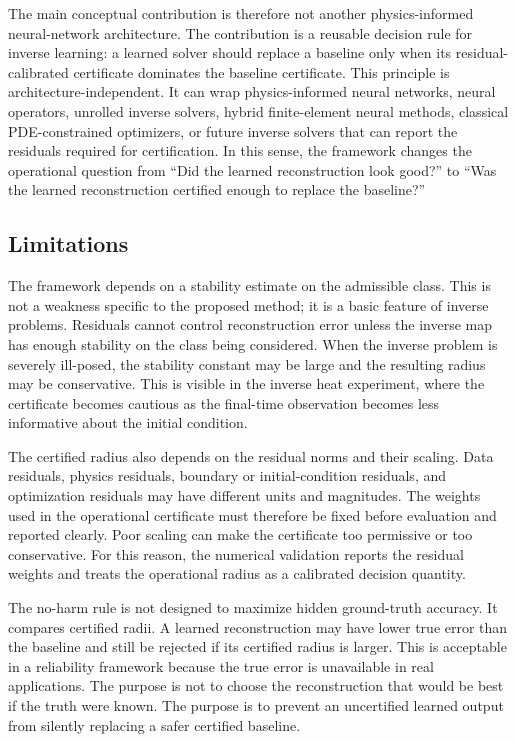 \documentclass{article}
\numberwithin{equation}{section}
\theoremstyle{definition}
\begin{document}
The main conceptual contribution is therefore not another physics-informed neural-network architecture. The contribution is a reusable decision rule for inverse learning: a learned solver should replace a baseline only when its residual-calibrated certificate dominates the baseline certificate. This principle is architecture-independent. It can wrap physics-informed neural networks, neural operators, unrolled inverse solvers, hybrid finite-element neural methods, classical PDE-constrained optimizers, or future inverse solvers that can report the residuals required for certification. In this sense, the framework changes the operational question from ``Did the learned reconstruction look good?'' to ``Was the learned reconstruction certified enough to replace the baseline?''

\subsection{Limitations}
\label{sec:limitations}

The framework depends on a stability estimate on the admissible class. This is not a weakness specific to the proposed method; it is a basic feature of inverse problems. Residuals cannot control reconstruction error unless the inverse map has enough stability on the class being considered. When the inverse problem is severely ill-posed, the stability constant may be large and the resulting radius may be conservative. This is visible in the inverse heat experiment, where the certificate becomes cautious as the final-time observation becomes less informative about the initial condition.

The certified radius also depends on the residual norms and their scaling. Data residuals, physics residuals, boundary or initial-condition residuals, and optimization residuals may have different units and magnitudes. The weights used in the operational certificate must therefore be fixed before evaluation and reported clearly. Poor scaling can make the certificate too permissive or too conservative. For this reason, the numerical validation reports the residual weights and treats the operational radius as a calibrated decision quantity.

The no-harm rule is not designed to maximize hidden ground-truth accuracy. It compares certified radii. A learned reconstruction may have lower true error than the baseline and still be rejected if its certified radius is larger. This is acceptable in a reliability framework because the true error is unavailable in real applications. The purpose is not to choose the reconstruction that would be best if the truth were known. The purpose is to prevent an uncertified learned output from silently replacing a safer certified baseline.
\end{document}
